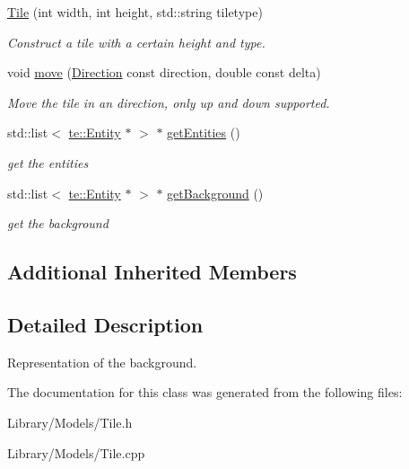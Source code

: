 \begin{DoxyCompactItemize}
\item 
\hypertarget{classty_lib_1_1_tile_aa050d52dcfb6193e113b776240923b6d}{}\hyperlink{classty_lib_1_1_tile_aa050d52dcfb6193e113b776240923b6d}{Tile} (int width, int height, std\+::string tiletype)\label{classty_lib_1_1_tile_aa050d52dcfb6193e113b776240923b6d}

\begin{DoxyCompactList}\small\item\em Construct a tile with a certain height and type. \end{DoxyCompactList}\item 
\hypertarget{classty_lib_1_1_tile_a59fbbbc6284d4768680138aaa7080093}{}void \hyperlink{classty_lib_1_1_tile_a59fbbbc6284d4768680138aaa7080093}{move} (\hyperlink{classty_lib_1_1_direction}{Direction} const direction, double const delta)\label{classty_lib_1_1_tile_a59fbbbc6284d4768680138aaa7080093}

\begin{DoxyCompactList}\small\item\em Move the tile in an direction, only up and down supported. \end{DoxyCompactList}\item 
\hypertarget{classty_lib_1_1_tile_a6f6409be0fd74df0d57499dd30975fae}{}std\+::list$<$ \hyperlink{classty_lib_1_1te_1_1_entity}{te\+::\+Entity} $\ast$ $>$ $\ast$ \hyperlink{classty_lib_1_1_tile_a6f6409be0fd74df0d57499dd30975fae}{get\+Entities} ()\label{classty_lib_1_1_tile_a6f6409be0fd74df0d57499dd30975fae}

\begin{DoxyCompactList}\small\item\em get the entities \end{DoxyCompactList}\item 
\hypertarget{classty_lib_1_1_tile_aad618620b76b0535d16da909eb479194}{}std\+::list$<$ \hyperlink{classty_lib_1_1te_1_1_entity}{te\+::\+Entity} $\ast$ $>$ $\ast$ \hyperlink{classty_lib_1_1_tile_aad618620b76b0535d16da909eb479194}{get\+Background} ()\label{classty_lib_1_1_tile_aad618620b76b0535d16da909eb479194}

\begin{DoxyCompactList}\small\item\em get the background \end{DoxyCompactList}\end{DoxyCompactItemize}
\subsection*{Additional Inherited Members}


\subsection{Detailed Description}
Representation of the background. 

The documentation for this class was generated from the following files\+:\begin{DoxyCompactItemize}
\item 
Library/\+Models/Tile.\+h\item 
Library/\+Models/Tile.\+cpp\end{DoxyCompactItemize}
